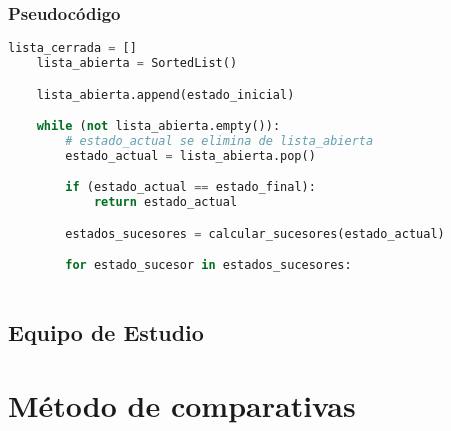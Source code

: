 \subsubsection{Pseudocódigo}

\begin{lstlisting}[language=Python]
    lista_cerrada = []
    lista_abierta = SortedList()

    lista_abierta.append(estado_inicial)

    while (not lista_abierta.empty()):
        # estado_actual se elimina de lista_abierta
        estado_actual = lista_abierta.pop()

        if (estado_actual == estado_final):
            return estado_actual

        estados_sucesores = calcular_sucesores(estado_actual)

        for estado_sucesor in estados_sucesores:
            
\end{lstlisting}

\subsection{Equipo de Estudio}

\section{Método de comparativas}

